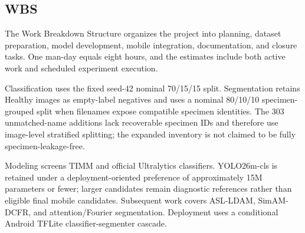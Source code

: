 \documentclass[12pt,a4paper]{report}
\newenvironment{revisionblock}{\begin{snugshade}\noindent}{\end{snugshade}}
\begin{document}
\subsection{WBS}
The Work Breakdown Structure organizes the project into planning, dataset preparation, model development, mobile integration, documentation, and closure tasks. One man-day equals eight hours, and the estimates include both active work and scheduled experiment execution.\par
\begin{revisionblock}
Classification uses the fixed seed-42 nominal 70/15/15 split. Segmentation retains Healthy images as empty-label negatives and uses a nominal 80/10/10 specimen-grouped split when filenames expose compatible specimen identities. The 303 unmatched-name additions lack recoverable specimen IDs and therefore use image-level stratified splitting; the expanded inventory is not claimed to be fully specimen-leakage-free.
\end{revisionblock}
\begin{revisionblock}
Modeling screens TIMM and official Ultralytics classifiers. YOLO26m-cls is retained under a deployment-oriented preference of approximately 15M parameters or fewer; larger candidates remain diagnostic references rather than eligible final mobile candidates. Subsequent work covers ASL-LDAM, SimAM-DCFR, and attention/Fourier segmentation. Deployment uses a conditional Android TFLite classifier-segmenter cascade.
\end{revisionblock}
\begingroup
\scriptsize
\setlength{\tabcolsep}{2pt}
\renewcommand{\arraystretch}{1.16}
\end{document}
